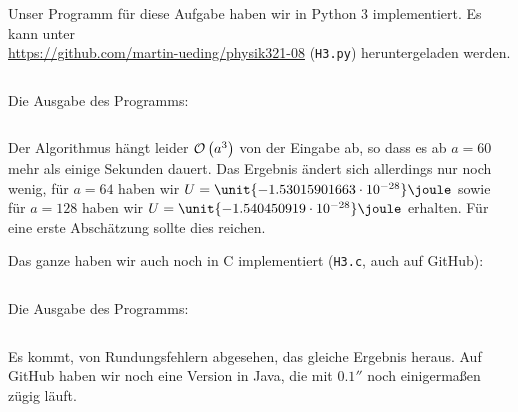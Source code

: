 \documentclass[11pt, ngerman, fleqn]{article}
\newcommand{\e}[1]{\cdot 10^{#1}}
\begin{document}
Unser Programm für diese Aufgabe haben wir in Python 3 implementiert. Es kann
unter \\ \url{https://github.com/martin-ueding/physik321-08} (\texttt{H3.py})
heruntergeladen werden.

\inputminted[fontsize=\small, frame=lines, linenos]{python}{H3.py}

Die Ausgabe des Programms:

\inputminted[fontsize=\small, frame=lines]{text}{H3.py.txt}

Der Algorithmus hängt leider $\mathcal O\del{a^3}$ von der Eingabe ab, so dass
es ab $a = 60$ mehr als einige Sekunden dauert. Das Ergebnis ändert sich
allerdings nur noch wenig, für $a = 64$ haben wir $U =
\unit{-1.53015901663\e{-28}}\joule$ sowie für $a = 128$ haben wir $U =
\unit{-1.540450919\e{-28}}\joule$ erhalten. Für eine erste Abschätzung sollte
dies reichen.

Das ganze haben wir auch noch in C implementiert (\texttt{H3.c}, auch auf
GitHub):

\inputminted[fontsize=\small, frame=lines, linenos, tabsize=4]{c}{H3.c}

Die Ausgabe des Programms:

\inputminted[fontsize=\small, frame=lines]{text}{H3.c.txt}

Es kommt, von Rundungsfehlern abgesehen, das gleiche Ergebnis heraus. Auf
GitHub haben wir noch eine Version in Java, die mit $\unit{0.1}\second$ noch
einigermaßen zügig läuft.

%
%
\end{document}
